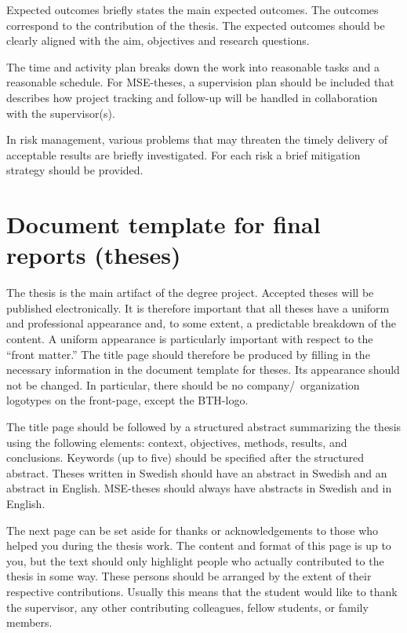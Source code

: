 \documentclass[a4paper,12pt]{book}
\begin{document}
Expected outcomes briefly states the main expected outcomes. The outcomes
correspond to the contribution of the thesis.
The expected outcomes should be clearly aligned with the aim, objectives and research questions.

The time and activity plan breaks down the work into reasonable
tasks and a reasonable schedule. For MSE-theses, a supervision plan should be included
that describes how project tracking and follow-up will be handled in collaboration with the supervisor(s).  

In risk management, various problems that may threaten the timely delivery of
acceptable results are briefly investigated. For each risk a brief mitigation
strategy should be provided.


\section{Document template for final reports (theses)}
The thesis is the main artifact of the degree project. Accepted
theses will be published electronically. It is therefore important that all
theses have a uniform and professional appearance and, to some extent,
a predictable breakdown of the content.
A uniform appearance is particularly important with respect to the ``front
matter.'' The title page should therefore be produced by filling in
the necessary information in the document template for theses. Its
appearance should not be changed. In particular, there should be no
company/~organization logotypes on the front-page, except the BTH-logo. 

The title page should be followed by a structured abstract summarizing
the thesis using the following elements: context, objectives, methods, results, and
conclusions. Keywords (up to five) should be specified after the structured abstract.
Theses written in Swedish should have an abstract in Swedish and an abstract in English.
MSE-theses should always have abstracts in Swedish and in English.

The next page can be set aside for thanks or acknowledgements to those who
helped you during the thesis work. The content and format of this page is
up to you, but the text should only highlight people who actually contributed
to the thesis in some way.
These persons should be arranged by the extent of their respective contributions.
Usually this means that the student would like to thank the supervisor, any other
contributing colleagues, fellow students, or family members.
\end{document}
